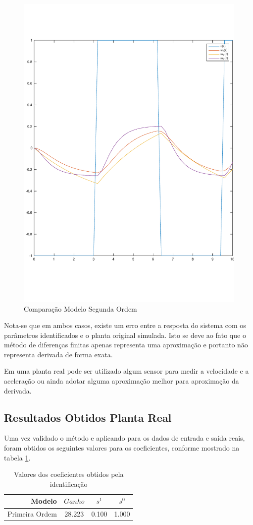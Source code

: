 \documentclass[a4paper,11pt]{article}
\begin{document}
\begin{figure}[H]
    \centering
    \includegraphics[width=0.6\linewidth]{tex/img/model2Evaluation.pdf}
    \caption{Comparação Modelo Segunda Ordem}
    \label{fig:model2Evaluation}
\end{figure}

Nota-se que em ambos casos, existe um erro entre a resposta do sistema com os parâmetros identificados e o planta original simulada. Isto se deve ao fato que o método de diferenças finitas apenas representa uma aproximação e portanto não representa derivada de forma exata.

Em uma planta real pode ser utilizado algum sensor para medir a velocidade e a aceleração ou ainda adotar alguma aproximação melhor para aproximação da derivada.



\subsection{Resultados Obtidos Planta Real}

Uma vez validado o método e aplicando para os dados de entrada e saída reais, foram obtidos os seguintes valores para os coeficientes, conforme mostrado na tabela \ref{tab:tf}.

\begin{table}[H]
    \centering
    \begin{tabular}{r|ccc}
    \hline
        Modelo & $Ganho$ & $s^1$ & $s^0$ \\
     \hline
        Primeira Ordem & 28.223 & 0.100 & 1.000 \\
     \hline
    \end{tabular}
    \caption{Valores dos coeficientes obtidos pela identificação}
    \label{tab:tf}
\end{table}
\end{document}
